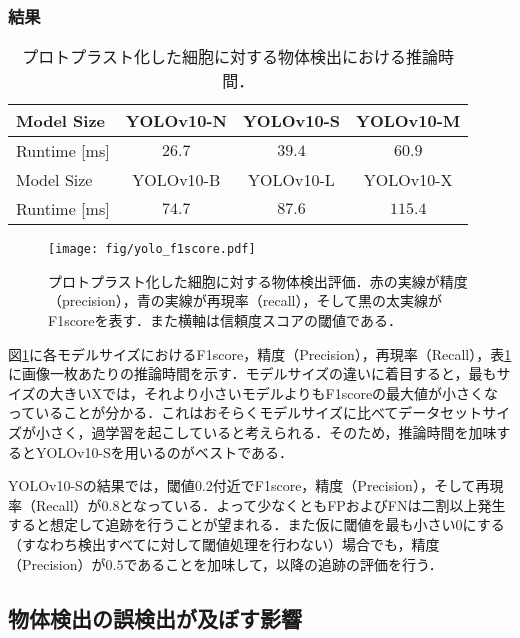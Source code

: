     \subsubsection{結果}

    \begin{table}[t]
        \centering
        \caption[プロトプラスト化した細胞に対する物体検出における推論時間]{プロトプラスト化した細胞に対する物体検出における推論時間．}
        \label{tab:yolo_runtime}
        \begin{tabular}{l|ccc}
            \hline Model Size & YOLOv10-N & YOLOv10-S & YOLOv10-M  
            \\\hline \hline Runtime [ms] & $26.7$ & $39.4$ & $60.9$ 
            \\ \hline Model Size & YOLOv10-B & YOLOv10-L & YOLOv10-X 
            \\ \hline \hline Runtime [ms] & $74.7$ & $87.6$ & $115.4$ 
        \end{tabular}
    \end{table}

    \begin{figure}[t]
        \centering
        \texttt{[image: fig/yolo\_f1score.pdf]}
        \caption[プロトプラスト化した細胞に対する物体検出評価]{プロトプラスト化した細胞に対する物体検出評価．赤の実線が精度（precision），青の実線が再現率（recall），そして黒の太実線がF1scoreを表す．また横軸は信頼度スコアの閾値である．}
        \label{fig:yolo_f1score}
    \end{figure}

    図\ref{fig:yolo_f1score}に各モデルサイズにおけるF1score，精度（Precision），再現率（Recall），表\ref{tab:yolo_runtime}に画像一枚あたりの推論時間を示す．モデルサイズの違いに着目すると，最もサイズの大きいXでは，それより小さいモデルよりもF1scoreの最大値が小さくなっていることが分かる．これはおそらくモデルサイズに比べてデータセットサイズが小さく，過学習を起こしていると考えられる．そのため，推論時間を加味するとYOLOv10-Sを用いるのがベストである．

    YOLOv10-Sの結果では，閾値$0.2$付近でF1score，精度（Precision），そして再現率（Recall）が$0.8$となっている．よって少なくともFPおよびFNは二割以上発生すると想定して追跡を行うことが望まれる．また仮に閾値を最も小さい$0$にする（すなわち検出すべてに対して閾値処理を行わない）場合でも，精度（Precision）が$0.5$であることを加味して，以降の追跡の評価を行う．

    \subsection{物体検出の誤検出が及ぼす影響}
    \label{subsec:FPeffect}

